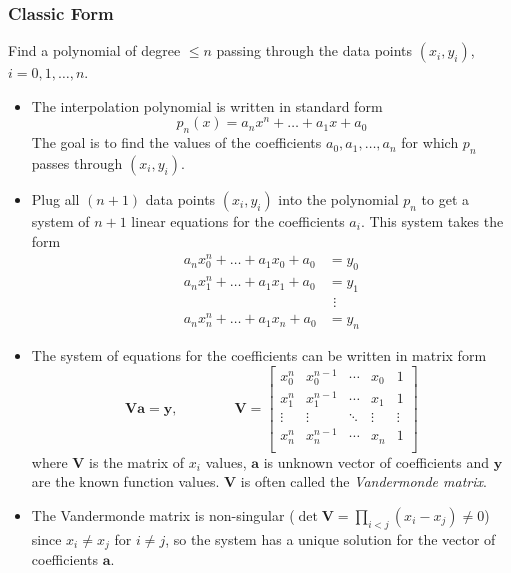 \documentclass[11pt, a4paper]{article}
\newcommand{\mat}[1]{\mathbf{#1}} %
\begin{document}
\subsubsection{Classic Form}
Find a polynomial of degree $ \leq n $ passing through the data points $ (x_{i}, y_{i}) $, $ i = 0, 1, \ldots, n $.
\begin{itemize}
	\item The interpolation polynomial is written in standard form 
	\begin{equation*}
		p_n(x) = a_n x^n + \dots + a_1 x + a_0
	\end{equation*}
	The goal is to find the values of the coefficients $ a_{0}, a_{1}, \ldots, a_{n} $ for which $ p_{n} $ passes through $ (x_{i}, y_{i}) $.
	
	\item Plug all $ (n+1) $ data points $ (x_i, y_i) $ into the polynomial $ p_{n} $ to get a system of $ n + 1 $ linear equations for the coefficients $ a_{i} $. This system takes the form
	\begin{align*}
		a_n x_0^n + \dots + a_1 x_0 + a_0 &= y_0\\
		a_n x_1^n + \dots + a_1 x_1 + a_0 &= y_1\\
		&\ \, \vdots\\
		a_n x_n^n + \dots + a_1 x_n + a_0 &= y_n
	\end{align*}
	
	\item The system of equations for the coefficients can be written in matrix form
	\begin{equation*}
		\mat{V}\bm{a} = \bm{y}, \qquad \qquad \mat{V} = 
		\begin{bmatrix} 
			x_{0}^{n} & x_{0}^{n-1} & \cdots & x_{0} & 1\\
			x_{1}^{n} & x_{1}^{n-1} & \cdots & x_{1} & 1\\
			\vdots & \vdots & \ddots & \vdots & \vdots\\
			x_{n}^{n} & x_{n}^{n-1} & \cdots & x_{n} & 1\\
		\end{bmatrix}
	\end{equation*}
	where $ \mat{V} $ is the matrix of $ x_{i} $ values, $ \bm{a} $ is unknown vector of coefficients and $ \bm{y} $ are the known function values. $ \mat{V} $ is often called the \textit{Vandermonde matrix}.
	
	\item The Vandermonde matrix is non-singular ($ \det \mat{V} = \prod_{i < j} (x_{i} - x_{j}) \neq 0$) since $ x_{i} \neq x_{j} $ for $ i \neq j $, so the system has a unique solution for the vector of coefficients $ \bm{a} $.
	

\end{itemize}
\end{document}
